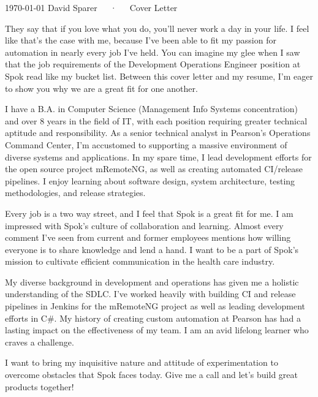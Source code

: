 \documentclass[11pt, a4paper]{awesome-cv}
\begin{document}
	\makecvheader[R]

	\makecvfooter
	  {\today}
	  {David Sparer~~~·~~~Cover Letter}
	  {}

	\makelettertitle

	\begin{cvletter}

		They say that if you love what you do, you'll never work a day in your life. I feel like that's the case with me, because I've been able to fit my passion for automation in nearly every job I've held. You can imagine my glee when I saw that the job requirements of the Development Operations Engineer position at Spok read like my bucket list. Between this cover letter and my resume, I'm eager to show you why we are a great fit for one another.

		I have a B.A. in Computer Science (Management Info Systems concentration) and over 8 years in the field of IT, with each position requiring greater technical aptitude and responsibility. As a senior technical analyst in Pearson's Operations Command Center, I'm accustomed to supporting a massive environment of diverse systems and applications. In my spare time, I lead development efforts for the open source project mRemoteNG, as well as creating automated CI/release pipelines. I enjoy learning about software design, system architecture, testing methodologies, and release strategies.

		Every job is a two way street, and I feel that Spok is a great fit for me. I am impressed with Spok's culture of collaboration and learning. Almost every comment I've seen from current and former employees mentions how willing everyone is to share knowledge and lend a hand. I want to be a part of Spok's mission to cultivate efficient communication in the health care industry.

		My diverse background in development and operations has given me a holistic understanding of the SDLC. I've worked heavily with building CI and release pipelines in Jenkins for the mRemoteNG project as well as leading development efforts in C\#. My history of creating custom automation at Pearson has had a lasting impact on the effectiveness of my team. I am an avid lifelong learner who craves a challenge.


		I want to bring my inquisitive nature and attitude of experimentation to overcome obstacles that Spok faces today. Give me a call and let's build great products together!

	\end{cvletter}


	\makeletterclosing
\end{document}

